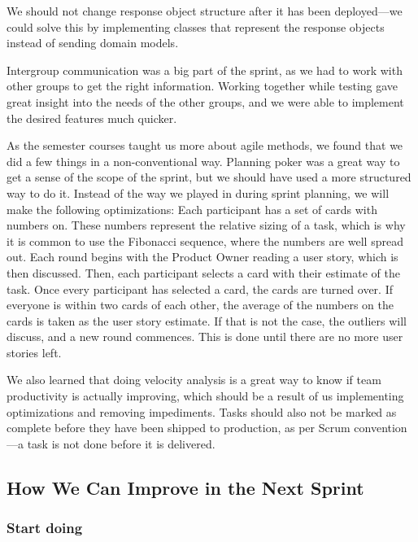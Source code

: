 We should not change response object structure after it has been deployed---we could solve this by implementing classes that represent the response objects instead of sending domain models. 

Intergroup communication was a big part of the sprint, as we had to work with other groups to get the right information. 
Working together while testing gave great insight into the needs of the other groups, and we were able to implement the desired features much quicker.

As the semester courses taught us more about agile methods, we found that we did a few things in a non-conventional way. Planning poker was a great way to get a sense of the scope of the sprint, but we should have used a more structured way to do it. 
Instead of the way we played in during sprint planning, we will make the following optimizations:
Each participant has a set of cards with numbers on. These numbers represent the relative sizing of a task, which is why it is common to use the Fibonacci sequence, where the numbers are well spread out.
Each round begins with the Product Owner reading a user story, which is then discussed. Then, each participant selects a card with their estimate of the task. Once every participant has selected a card, the cards are turned over. If everyone is within two cards of each other, the average of the numbers on the cards is taken as the user story estimate. If that is not the case, the outliers will discuss, and a new round commences.
This is done until there are no more user stories left\cite{sutherlandScrumArtDoing2014}.


We also learned that doing velocity analysis is a great way to know if team productivity is actually improving, which should be a result of us implementing optimizations and removing impediments.
Tasks should also not be marked as complete before they have been shipped to production, as per Scrum convention---a task is not done before it is delivered\cite{sutherlandScrumArtDoing2014}.

\subsection{How We Can Improve in the Next Sprint}

\subsubsection{Start doing}

